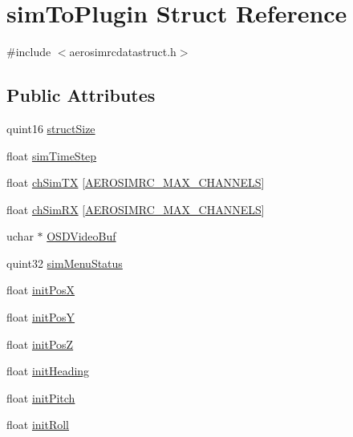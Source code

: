 \hypertarget{structsim_to_plugin}{\section{sim\-To\-Plugin \-Struct \-Reference}
\label{structsim_to_plugin}
}


{\ttfamily \#include $<$aerosimrcdatastruct.\-h$>$}

\subsection*{\-Public \-Attributes}
\begin{DoxyCompactItemize}
\item 
quint16 \hyperlink{group___aero_sim_r_c_gab277fde5232c4a8c41adcdcc1dc7199f}{struct\-Size}
\item 
float \hyperlink{group___aero_sim_r_c_ga58a610591c7eb9b7e1f32208e4cb343c}{sim\-Time\-Step}
\item 
float \hyperlink{group___aero_sim_r_c_gae5ff2433affe60bce670d0c6bf66ee06}{ch\-Sim\-T\-X} \mbox{[}\hyperlink{group___aero_sim_r_c_ga63f989ac10cdcbfefadc5e65055d3c7d}{\-A\-E\-R\-O\-S\-I\-M\-R\-C\-\_\-\-M\-A\-X\-\_\-\-C\-H\-A\-N\-N\-E\-L\-S}\mbox{]}
\item 
float \hyperlink{group___aero_sim_r_c_gadefc3aa551adb807da0171a7a92f73ee}{ch\-Sim\-R\-X} \mbox{[}\hyperlink{group___aero_sim_r_c_ga63f989ac10cdcbfefadc5e65055d3c7d}{\-A\-E\-R\-O\-S\-I\-M\-R\-C\-\_\-\-M\-A\-X\-\_\-\-C\-H\-A\-N\-N\-E\-L\-S}\mbox{]}
\item 
uchar $\ast$ \hyperlink{group___aero_sim_r_c_gadc2b5a377a36c5f5d2dfae169880bb1c}{\-O\-S\-D\-Video\-Buf}
\item 
quint32 \hyperlink{group___aero_sim_r_c_ga1cc3af651b3f3382357e9a882abc64d4}{sim\-Menu\-Status}
\item 
float \hyperlink{group___aero_sim_r_c_ga23ae6e8ef17ad84cc500793e730df894}{init\-Pos\-X}
\item 
float \hyperlink{group___aero_sim_r_c_gacb4ac6e2ad9d5f215153b9fea05b66bf}{init\-Pos\-Y}
\item 
float \hyperlink{group___aero_sim_r_c_ga020dda7446e3217a8c779458a74feec8}{init\-Pos\-Z}
\item 
float \hyperlink{group___aero_sim_r_c_gaab0124b4fd93c132aacdb2cb2a755770}{init\-Heading}
\item 
float \hyperlink{group___aero_sim_r_c_gacc022659d5c4b32c0a878bdc6eea0f53}{init\-Pitch}
\item 
float \hyperlink{group___aero_sim_r_c_ga26c1191f08e580c1cdbd02791eabe60e}{init\-Roll}

\end{DoxyCompactItemize}

